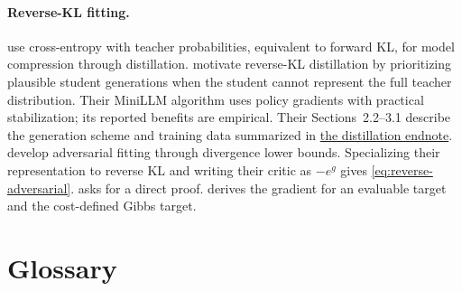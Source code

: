 \documentclass[11pt,twoside]{article}
\theoremstyle{definition}
\theoremstyle{remark}
\begin{document}
\paragraph{Reverse-KL fitting.}
\label{note:reverse-fitting}
\citet[Section~2]{hinton2015} use cross-entropy with teacher probabilities,
equivalent to forward KL, for model compression through distillation.
\citet[Sections~1--2]{gu2024} motivate reverse-KL distillation by
prioritizing plausible student generations when the student cannot
represent the full teacher distribution. Their MiniLLM algorithm uses
policy gradients with practical stabilization; its reported benefits are
empirical. Their Sections~2.2--3.1 describe the generation scheme and
training data summarized in \hyperref[en:distillation]{the distillation endnote}.
\citet[Sections~2.2--2.3]{nowozin2016} develop adversarial
fitting through divergence lower bounds. Specializing their representation
to reverse KL and writing their critic as \(-e^g\) gives
\cref{eq:reverse-adversarial}.
 asks for a direct proof.
 derives the gradient for an evaluable
target and the cost-defined Gibbs target.



\clearpage

\section*{Glossary}
\label{sec:glossary}
\end{document}
